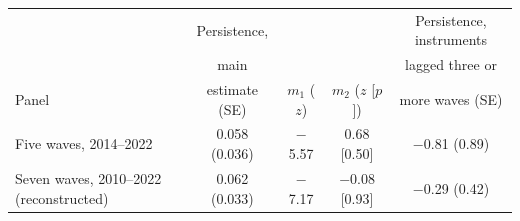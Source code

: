 \begin{tabular}{@{}p{4.6cm}cccc@{}}
\toprule
 & Persistence, & & & Persistence, instruments \\
 & main & & & lagged three or \\
Panel & estimate (SE) & $m_1$ ($z$) & $m_2$ ($z$ [$p$]) & more waves (SE) \\
\midrule
Five waves, 2014--2022 & 0.058 (0.036) & $-$5.57 & 0.68 [0.50] & $-$0.81 (0.89) \\
Seven waves, 2010--2022 (reconstructed) & 0.062 (0.033) & $-$7.17 & $-$0.08 [0.93] & $-$0.29 (0.42) \\
\bottomrule
\end{tabular}
